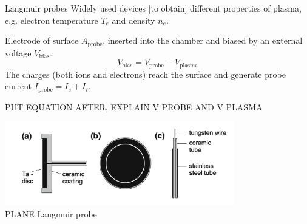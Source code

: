 \documentclass[10pt]{beamer}
\newcommand{\probecurrent}[0]{\ensuremath{I_{\mathrm{probe}}}}
\newcommand{\biasvoltage}{\ensuremath{V_{\mathrm{bias}}}}
\newcommand{\probevoltage}{\ensuremath{V_{\mathrm{probe}}}}
\newcommand{\plasmavoltage}{\ensuremath{V_{\mathrm{plasma}}}}
\begin{document}
\begin{frame}{Langmuir probes}
    Widely used devices [to obtain] different properties of plasma, e.g. electron temperature $T_e$ and density $n_e$.
    \vspace{0.4cm}

    Electrode of surface $A_{\mathrm{probe}}$, inserted into the chamber and biased by an external voltage $\biasvoltage$.
    \begin{equation*}
        \biasvoltage= \probevoltage - \plasmavoltage
    \end{equation*}
    The charges (both ions and electrons) reach the surface and generate probe current $\probecurrent = I_e + I_i$.

    PUT EQUATION AFTER, EXPLAIN V PROBE AND V PLASMA 
    \begin{center}
        \includegraphics[width=0.75\textwidth]{../figures/langmuir_probe.png}
        \\
        PLANE Langmuir probe 
    \end{center}
\end{frame}
\end{document}
